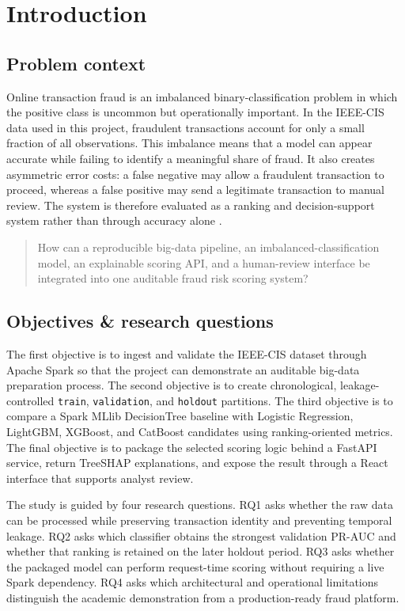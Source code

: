 \chapter{Introduction}
\label{chap:introduction}

\section{Problem context}

Online transaction fraud is an imbalanced binary-classification problem in which the positive class is uncommon but operationally important. In the IEEE-CIS data used in this project, fraudulent transactions account for only a small fraction of all observations. This imbalance means that a model can appear accurate while failing to identify a meaningful share of fraud. It also creates asymmetric error costs: a false negative may allow a fraudulent transaction to proceed, whereas a false positive may send a legitimate transaction to manual review. The system is therefore evaluated as a ranking and decision-support system rather than through accuracy alone \parencite{ieeecis2019,amazonfraudbenchmark}.

\begin{quote}
How can a reproducible big-data pipeline, an imbalanced-classification model, an explainable scoring API, and a human-review interface be integrated into one auditable fraud risk scoring system?
\end{quote}

\section{Objectives \& research questions}

The first objective is to ingest and validate the  IEEE-CIS dataset through Apache Spark so that the project can demonstrate an auditable big-data preparation process. The second objective is to create chronological, leakage-controlled \texttt{train}, \texttt{validation}, and \texttt{holdout} partitions. The third objective is to compare a Spark MLlib DecisionTree baseline with Logistic Regression, LightGBM, XGBoost, and CatBoost candidates using ranking-oriented metrics. The final objective is to package the selected scoring logic behind a FastAPI service, return TreeSHAP explanations, and expose the result through a React interface that supports analyst review.

The study is guided by four research questions. RQ1 asks whether the raw data can be processed while preserving transaction identity and preventing temporal leakage. RQ2 asks which classifier obtains the strongest validation PR-AUC and whether that ranking is retained on the later holdout period. RQ3 asks whether the packaged model can perform request-time scoring without requiring a live Spark dependency. RQ4 asks which architectural and operational limitations distinguish the academic demonstration from a production-ready fraud platform.

